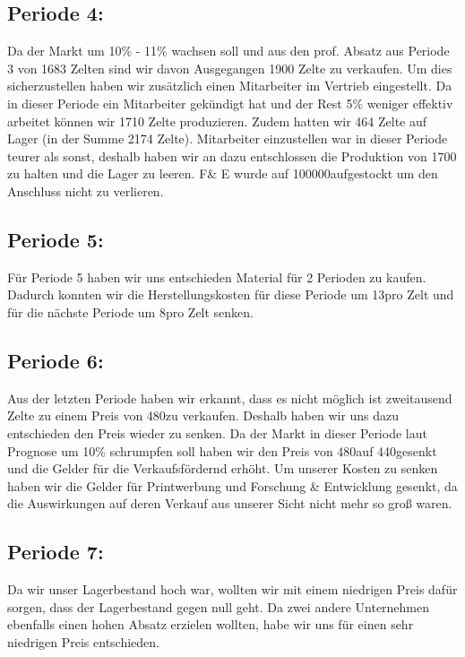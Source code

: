 \documentclass[a4paper, 12pt]{article}
\begin{document}
\subsection{Periode 4:}
Da der Markt um 10\% - 11\% wachsen soll und aus den prof. Absatz aus Periode 3 von 1683 Zelten sind wir davon Ausgegangen 1900 Zelte zu verkaufen.
Um dies sicherzustellen haben wir zusätzlich einen Mitarbeiter im Vertrieb eingestellt.
Da in dieser Periode ein Mitarbeiter gekündigt hat und der Rest 5\% weniger effektiv arbeitet können wir  1710 Zelte produzieren.
Zudem hatten wir 464 Zelte auf Lager (in der Summe 2174 Zelte).
Mitarbeiter einzustellen war in dieser Periode teurer als sonst,
deshalb haben wir an dazu entschlossen die Produktion von 1700 zu halten und die Lager zu leeren.
F\& E wurde auf 100000\texteuro aufgestockt um den Anschluss nicht zu verlieren.  

\subsection{Periode 5:}
Für Periode 5 haben wir uns entschieden Material für 2 Perioden zu kaufen.
Dadurch konnten wir die Herstellungskosten für diese Periode um 13\texteuro pro Zelt und für die nächste Periode um 8\texteuro pro Zelt senken.

\subsection{Periode 6:}
Aus der letzten Periode haben wir erkannt, dass es nicht möglich ist zweitausend Zelte zu einem Preis von 480\texteuro zu verkaufen.
Deshalb haben wir uns dazu entschieden den Preis wieder zu senken.
Da der Markt in dieser Periode laut Prognose um 10\% schrumpfen soll haben wir den Preis von 480\texteuro auf 440\texteuro gesenkt und die Gelder für die Verkaufsfördernd erhöht.
Um unserer Kosten zu senken haben wir die Gelder für Printwerbung und Forschung \& Entwicklung gesenkt, da die Auswirkungen auf deren Verkauf aus unserer Sicht nicht mehr so groß waren.


\subsection{Periode 7:}
Da wir unser Lagerbestand hoch war, wollten wir mit einem niedrigen Preis dafür sorgen,
dass der Lagerbestand gegen null geht.
Da zwei andere Unternehmen ebenfalls einen hohen Absatz erzielen wollten, habe wir uns für einen sehr niedrigen Preis entschieden.
\end{document}
